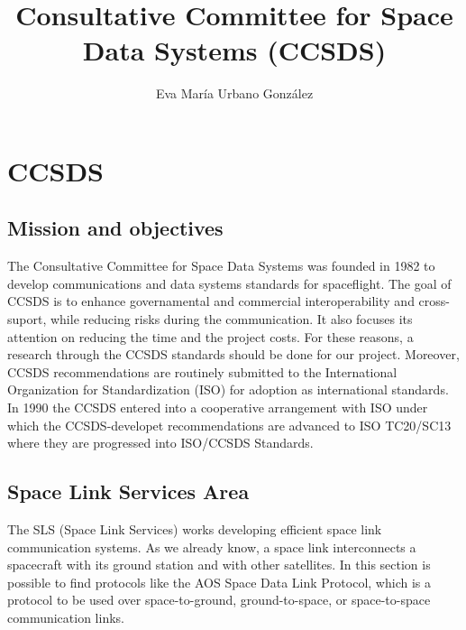 \documentclass[12pt,a4paper]{report}
\author{Eva María Urbano González\\}
\title{Consultative Committee for Space Data Systems (CCSDS)}
\begin{document}
\maketitle
\section{CCSDS}
\subsection{Mission and objectives}
The Consultative Committee for Space Data Systems was founded in 1982 to develop communications and data systems standards for spaceflight. The goal of CCSDS is to enhance governamental and commercial interoperability and cross-suport, while reducing risks during the communication. It also focuses its attention on reducing the time and the project costs.  For these reasons, a research through the CCSDS standards should be done for our project. Moreover, CCSDS recommendations are routinely submitted to the International Organization for Standardization (ISO) for adoption as international standards. In 1990 the CCSDS entered into a cooperative arrangement with ISO under which the CCSDS-developet recommendations are advanced to ISO TC20/SC13 where they are progressed into ISO/CCSDS Standards. 
\subsection{Space Link Services Area}
The SLS (Space Link Services) works developing efficient space link communication systems. As we already know, a space link interconnects a spacecraft with its ground station and with other satellites. In this section is possible to find protocols like the AOS Space Data Link Protocol, which is a protocol to be used over space-to-ground, ground-to-space, or space-to-space communication links.\cite{CC2006}  
 
\end{document}

